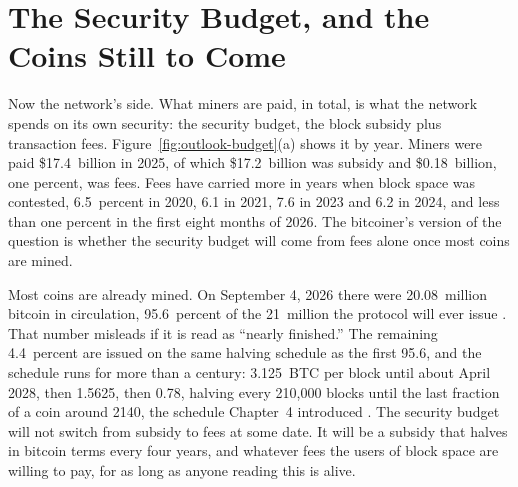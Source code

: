 \section{The Security Budget, and the Coins Still to Come}
\label{sec:outlook-budget}

Now the network's side. What miners are paid, in total, is what the network spends on its own security: the security budget, the block subsidy plus transaction fees. Figure~\ref{fig:outlook-budget}(a) shows it by year. Miners were paid \$17.4~billion in 2025, of which \$17.2~billion was subsidy and \$0.18~billion, one percent, was fees. Fees have carried more in years when block space was contested, 6.5~percent in 2020, 6.1 in 2021, 7.6 in 2023 and 6.2 in 2024, and less than one percent in the first eight months of 2026. %
The bitcoiner's version of the question is whether the security budget will come from fees alone once most coins are mined.

Most coins are already mined. On September 4, 2026 there were 20.08~million bitcoin in circulation, 95.6~percent of the 21~million the protocol will ever issue \autocite{blockchaininfocharts}. %
That number misleads if it is read as ``nearly finished.'' The remaining 4.4~percent are issued on the same halving schedule as the first 95.6, and the schedule runs for more than a century: 3.125~BTC per block until about April 2028, then 1.5625, then 0.78, halving every 210,000 blocks until the last fraction of a coin around 2140, the schedule Chapter~4 introduced \autocite{mempool840000,braiins2024miningbasics}. %
The security budget will not switch from subsidy to fees at some date. It will be a subsidy that halves in bitcoin terms every four years, and whatever fees the users of block space are willing to pay, for as long as anyone reading this is alive.

